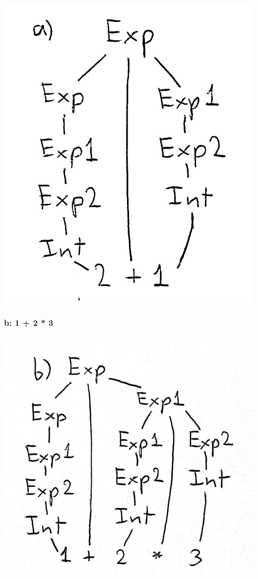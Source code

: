 \documentclass{article}
\theoremstyle{theorem}
\theoremstyle{definition}
\theoremstyle{remark}
\begin{document}
\begin{center}
\includegraphics*[scale=0.13]{treeA.jpg}
\end{center}

\subsubsection*{b: 1 + 2 * 3}

\begin{center}
  \includegraphics*[scale=0.1]{treeB.jpg}
  \end{center}
\end{document}
